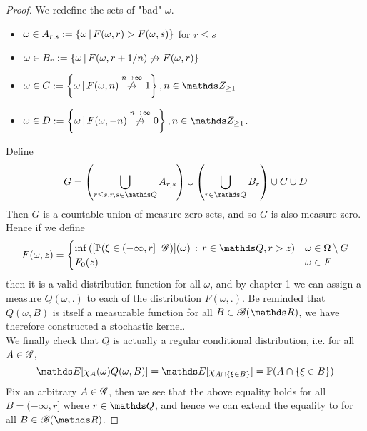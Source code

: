 \begin{unexaminable}
\begin{proof}
We redefine the sets of "bad" $\omega$.
\begin{itemize}
    \item $\omega \in A_{r,s} := \left\{ \omega \,|\, F(\omega,r) > F(\omega,s) \right \}$ for $r \leq s$
    \item $\omega \in B_r := \left\{ \omega \,|\, F(\omega, r + 1/n) \not\rightarrow F(\omega,r) \right \}$
    \item $\omega \in C := \set{\omega \,|\, F(\omega,n) \overset{n\to \infty}{\not\rightarrow} 1}, n \in \Z_{\geq 1}$
    \item $\omega \in D := \set{\omega \,|\, F(\omega,-n) \overset{n\to \infty}{\not\rightarrow} 0}, n \in \Z_{\geq 1}$.
\end{itemize}
Define 
\begin{equation}
    G = \bracket{\bigcup_{r\leq s, \\ r,s \in \Q} A_{r,s}} \cup \bracket{\bigcup_{r \in \Q} B_r} \cup C \cup D
\end{equation}
Then $G$ is a countable union of measure-zero sets, and so $G$ is also measure-zero. Hence if we define
\begin{equation}
    F(\omega, z) = \begin{cases}
    \inf\bracket{[\p(\xi \in (-\infty, r] \,|\, \G)](\omega) \,:\, r \in \Q, r > z} & \omega \in \Omega \setminus G \\
    F_0(z) & \omega \in F
    \end{cases}
\end{equation}
then it is a valid distribution function for all $\omega$, and by chapter 1 we can assign a measure $Q(\omega,.)$ to each of the distribution $F(\omega,.)$. Be reminded that $Q(\omega,B)$ is itself a measurable function for all $B \in \B(\R)$, we have therefore constructed a stochastic kernel. \\

We finally check that $Q$ is actually a regular conditional distribution, i.e. for all $A \in \mathcal{G}$,
\begin{equation}
    \E[\chi_A(\omega) Q(\omega, B)] = \E[\chi_{A \cap \set{\xi \in B}}] = \p(A \cap \set{\xi \in B})
\end{equation}
Fix an arbitrary $A \in \mathcal{G}$, then we see that the above equality holds for all $B = (-\infty,r]$ where $r \in \Q$, and hence we can extend the equality to for all $B \in \B(\R)$.
\end{proof}


\end{unexaminable}
